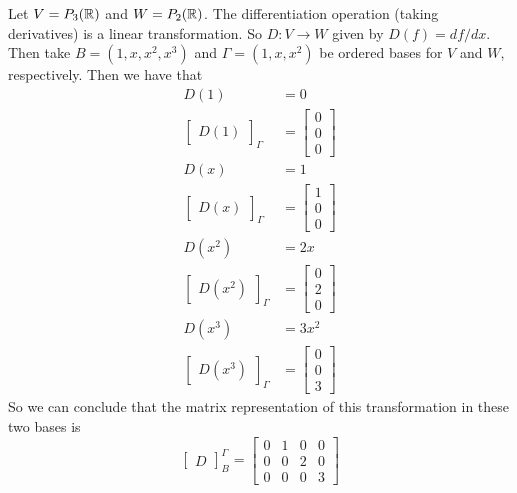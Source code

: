 \documentclass[main.tex]{subfiles}
\begin{document}
    \begin{example}{}{}
        Let $V = P_3(\mathbb{R})$ and $W = P_2(\mathbb{R})$. The differentiation operation (taking derivatives) is a linear transformation. So $D: V\to W$ given by $D(f) = df/dx$. Then take $B = (1, x, x^2, x^3)$ and $\Gamma = (1, x, x^2)$ be ordered bases for $V$ and $W$, respectively. Then we have that 
        \begin{align*}
            D(1) &= 0 \\
            \begin{bmatrix} D(1) \end{bmatrix}_\Gamma &= \begin{bmatrix}
                0 \\ 0 \\ 0
            \end{bmatrix} \\
            D(x) &= 1 \\
            \begin{bmatrix} D(x) \end{bmatrix}_\Gamma &= \begin{bmatrix}
                1 \\ 0 \\ 0
            \end{bmatrix} \\
            D(x^2) &= 2x \\
            \begin{bmatrix} D(x^2) \end{bmatrix}_\Gamma &= \begin{bmatrix}
                0 \\ 2 \\ 0
            \end{bmatrix} \\
            D(x^3) &= 3x^2 \\
            \begin{bmatrix} D(x^3) \end{bmatrix}_\Gamma &= \begin{bmatrix}
                0 \\ 0 \\ 3
            \end{bmatrix}
        \end{align*}
        So we can conclude that the matrix representation of this transformation in these two bases is 
        \begin{equation*}
            \begin{bmatrix} D \end{bmatrix}_{B}^{\Gamma} = \begin{bmatrix}
                0 & 1 & 0 & 0 \\
                0 & 0 & 2 & 0 \\
                0 & 0 & 0 & 3
            \end{bmatrix}
        \end{equation*}
    \end{example}
\end{document}
